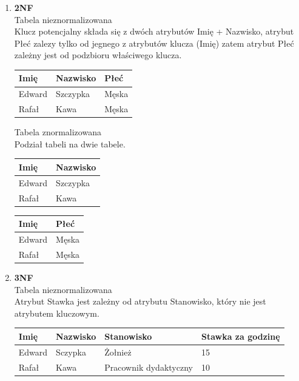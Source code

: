 \documentclass[12pt]{article}
\begin{document}
\begin{enumerate}
        \item \textbf{2NF}\\
        Tabela nieznormalizowana\\
        Klucz potencjalny składa się z dwóch atrybutów Imię + Nazwisko, atrybut Płeć zalezy tylko od jegnego z atrybutów klucza (Imię) zatem atrybut Płeć zależny jest od podzbioru właściwego klucza.
        \begin{table}[H]
        \begin{tabular}{|l|l|l|}
        \hline
        Imię   & Nazwisko & Płeć  \\ \hline
        Edward & Szczypka & Męska \\ \hline
        Rafał  & Kawa     & Męska \\ \hline
        \end{tabular}
        \end{table}
        
        Tabela znormalizowana\\
        Podział tabeli na dwie tabele.
        
        \begin{table}[H]
        \begin{tabular}{|l|l|}
        \hline
        Imię   & Nazwisko \\ \hline
        Edward & Szczypka \\ \hline
        Rafał  & Kawa     \\ \hline
        \end{tabular}
        \end{table}
        
        \begin{table}[H]
        \begin{tabular}{|l|l|}
        \hline
        Imię   & Płeć  \\ \hline
        Edward & Męska \\ \hline
        Rafał  & Męska \\ \hline
        \end{tabular}
        \end{table}
        
        \item \textbf{3NF}\\
        Tabela nieznormalizowana\\
        Atrybut Stawka jest zależny od atrybutu Stanowisko, który nie jest atrybutem kluczowym.
        \begin{table}[H]
        \begin{tabular}{|l|l|l|l|}
        \hline
        Imię   & Nazwisko & Stanowisko            & Stawka za godzinę \\ \hline
        Edward & Sczypka  & Żołnież               & 15                \\ \hline
        Rafał  & Kawa     & Pracownik dydaktyczny & 10                \\ \hline
        \end{tabular}
        \end{table}
        

\end{enumerate}
\end{document}

